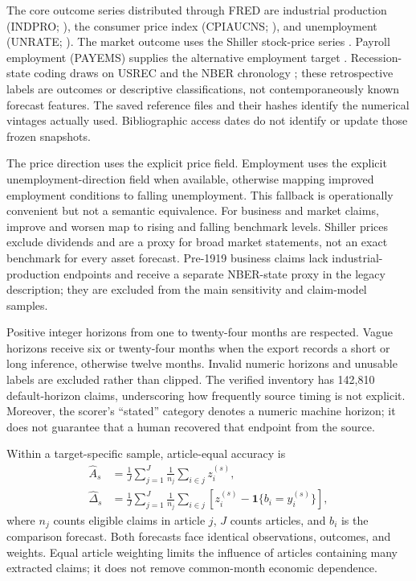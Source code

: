 \documentclass[iicol,pdflatex,sn-mathphys-num]{sn-jnl}
\begin{document}
The core outcome series distributed through FRED are industrial production (INDPRO; \citealp{fredindpro}), the consumer price index (CPIAUCNS; \citealp{fredcpi}), and unemployment (UNRATE; \citealp{fredunrate}). The market outcome uses the Shiller stock-price series \citep{shiller}. Payroll employment (PAYEMS) supplies the alternative employment target \citep{fredpayems}. Recession-state coding draws on USREC and the NBER chronology \citep{fredusrec,nber}; these retrospective labels are outcomes or descriptive classifications, not contemporaneously known forecast features. The saved reference files and their hashes identify the numerical vintages actually used. Bibliographic access dates do not identify or update those frozen snapshots.

The price direction uses the explicit price field. Employment uses the explicit unemployment-direction field when available, otherwise mapping improved employment conditions to falling unemployment. This fallback is operationally convenient but not a semantic equivalence. For business and market claims, improve and worsen map to rising and falling benchmark levels. Shiller prices exclude dividends and are a proxy for broad market statements, not an exact benchmark for every asset forecast. Pre-1919 business claims lack industrial-production endpoints and receive a separate NBER-state proxy in the legacy description; they are excluded from the main sensitivity and claim-model samples.

Positive integer horizons from one to twenty-four months are respected. Vague horizons receive six or twenty-four months when the export records a short or long inference, otherwise twelve months. Invalid numeric horizons and unusable labels are excluded rather than clipped. The verified inventory has 142,810 default-horizon claims, underscoring how frequently source timing is not explicit. Moreover, the scorer's ``stated'' category denotes a numeric machine horizon; it does not guarantee that a human recovered that endpoint from the source.

Within a target-specific sample, article-equal accuracy is
\begin{equation}
 \begin{aligned}\widehat A_s&=\frac{1}{J}\sum_{j=1}^{J}\frac{1}{n_j}
     \sum_{i\in j}z_i^{(s)},\\
 \widehat\Delta_s&=\frac{1}{J}\sum_{j=1}^{J}\frac{1}{n_j}
     \sum_{i\in j}\left[z_i^{(s)}-\mathbf{1}\{b_i=y_i^{(s)}\}\right],
 \end{aligned}\label{eq:paired}
\end{equation}
where $n_j$ counts eligible claims in article $j$, $J$ counts articles, and $b_i$ is the comparison forecast. Both forecasts face identical observations, outcomes, and weights. Equal article weighting limits the influence of articles containing many extracted claims; it does not remove common-month economic dependence.
\end{document}
